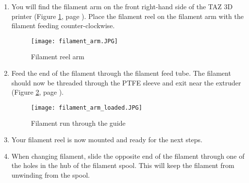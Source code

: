\begin{enumerate}

\item You will find the filament arm on the front right-hand side of the TAZ 3D printer (Figure \ref{fig:filament_arm}, page \pageref{fig:filament_arm}). Place the filament reel on the filament arm with the filament feeding counter-clockwise.

\begin{figure}[H]
\centering
\texttt{[image: filament\_arm.JPG]}
\caption{Filament reel arm}
\label{fig:filament_arm}
\end{figure}

\item Feed the end of the filament through the filament feed tube. The filament should now be threaded through the PTFE sleeve and exit near the extruder (Figure \ref{fig:filament_arm_loaded}, page \pageref{fig:filament_arm_loaded}).

\begin{figure}[H]
\centering
\texttt{[image: filament\_arm\_loaded.JPG]}
\caption{Filament run through the guide}
\label{fig:filament_arm_loaded}
\end{figure}

\item Your filament reel is now mounted and ready for the next steps.

\item When changing filament, slide the opposite end of the filament through one of the holes in the hub of the filament spool. This will keep the filament from unwinding from the spool.

\end{enumerate}


